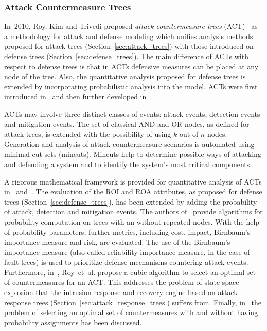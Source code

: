 \documentclass[a4paper]{article}
\begin{document}
\subsubsection{Attack Countermeasure Trees} 
\hypertarget{ACT}{\label{sec:attack_countermeasure_trees}}

In~$2010$, Roy, Kim and Trivedi proposed \emph{attack countermeasure trees}
(ACT)~\cite{RoKiTr3,RoKiTr} as a methodology for attack and defense  modeling
which unifies analysis methods proposed for attack trees
(Section~\ref{sec:attack_trees}) with those introduced on defense trees
(Section~\ref{sec:defense_trees}). The main difference of ACTs with respect to
defense trees is that in ACTs defensive measures can be placed at any node of
the tree. Also, the quantitative analysis proposed for defense trees is extended
by incorporating probabilistic analysis into the model. ACTs were first
introduced in~\cite{RoKiTr} and then further developed in~\cite{RoKiTr2}.

ACTs may involve three distinct classes of events: attack events, detection
events and mitigation events. The set of classical AND and OR nodes, as defined
for attack trees, is extended with the possibility of using $k$-out-of-$n$
nodes. Generation and analysis of attack countermeasure scenarios is automated
using minimal cut sets (mincuts). Mincuts help to determine possible ways of
attacking and defending a system and to identify the system's most critical
components.

A rigorous mathematical framework is provided for quantitative analysis of ACTs 
in~\cite{RoKiTr} and~\cite{RoKiTr2}. The evaluation of the ROI and ROA
attributes, as proposed for defense trees (Section~\ref{sec:defense_trees}), has
been extended by adding the probability of attack, detection and mitigation
events. The authors of~\cite{RoKiTr2} provide algorithms for probability
computation on trees with an without repeated nodes. With the help of
probability parameters, further metrics, including cost, impact, Birnbaum's
importance measure and risk, are evaluated. The use of the Birnbaum's importance
measure (also called reliability importance measure, in the case of fault trees)
is used to prioritize defense mechanisms countering attack events. Furthermore,
in~\cite{RoKiTr2}, Roy~et~al. propose a cubic algorithm to select an optimal set
of countermeasures for an ACT. This addresses the problem of state-space
explosion that the intrusion response and recovery engine based on
attack-response trees (Section~\ref{sec:attack_response_trees}) suffers from.
Finally, in~\cite{RoKiTr4} the problem of selecting an optimal set of
countermeasures with and without having probability assignments has been
discussed.
\end{document}
